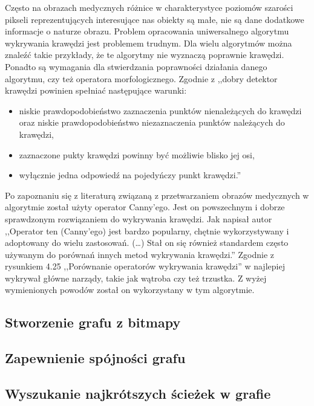\documentclass[a4paper,11pt,twoside]{report}
\theoremstyle{definition}
\begin{document}
Często na obrazach medycznych różnice w charakterystyce poziomów szarości pikseli reprezentujących interesujące nas obiekty są małe, nie są dane dodatkowe informacje o naturze obrazu. Problem opracowania uniwersalnego algorytmu wykrywania krawędzi jest problemem trudnym. Dla wielu algorytmów można znaleźć takie przykłady, że te algorytmy nie wyznaczą poprawnie krawędzi. Ponadto są wymagania dla stwierdzania poprawności działania danego algorytmu, czy też operatora morfologicznego. Zgodnie z \cite{Cyfrowe przetwarzanie obrazów medycznych} ,,dobry detektor krawędzi powinien spełniać następujące warunki:
\begin{itemize}[noitemsep]
\item {niskie prawdopodobieństwo zaznaczenia punktów nienależących do krawędzi oraz niskie prawdopodobieństwo niezaznaczenia punktów należących do krawędzi,}
\item {zaznaczone pukty krawędzi powinny być możliwie blisko jej osi,}
\item {wyłącznie jedna odpowiedź na pojedyńczy punkt krawędzi.''}
\end{itemize}

Po zapoznaniu się z literaturą związaną z przetwarzaniem obrazów medycznych w algorytmie został użyty operator Canny'ego. Jest on powszechnym i dobrze sprawdzonym rozwiązaniem do wykrywania krawędzi. Jak napisał autor \cite{Cyfrowe przetwarzanie obrazów medycznych} ,,Operator ten (Canny'ego) jest bardzo popularny, chętnie wykorzystywany i adoptowany do wielu zastosowań. (\dots) Stał on się również standardem często używanym do porównań innych metod wykrywania krawędzi.'' Zgodnie z rysunkiem 4.25 ,,Porównanie operatorów wykrywania krawędzi'' w \cite{Cyfrowe przetwarzanie obrazów medycznych} najlepiej wykrywał główne narządy, takie jak wątroba czy też trzustka. Z wyżej wymienionych powodów został on wykorzystany w tym algorytmie.



\subsection {Stworzenie grafu z bitmapy}

\subsection {Zapewnienie spójności grafu}

\subsection {Wyszukanie najkrótszych ścieżek w grafie}
\end{document}
